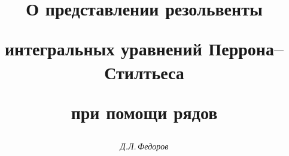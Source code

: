 









\newcommand{\integral}[2]{\int_#1^#2}


\newcommand{\norm}[1]{\| #1\|}


\newcommand{\C}{\Bbb C}


\newcommand{\tts}[1]{}







\setcounter{page}{76}















\author{\it Д.Л.\,Федоров}




\title{О представлении резольвенты


интегральных уравнений Перрона--Стилтьеса


при помощи рядов}





\date{}




\pagestyle{plain} %







\maketitle



